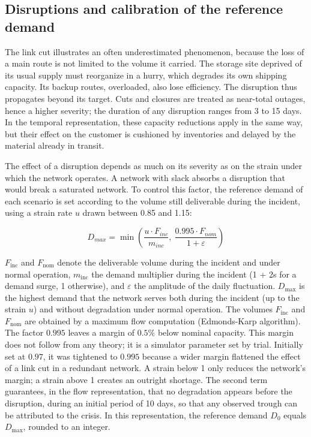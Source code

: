 \subsection{Disruptions and calibration of the reference demand}
\label{sec:S3.3}

The link cut illustrates an often underestimated phenomenon, because the loss of a main route is not limited to the volume it carried. The storage site deprived of its usual supply must reorganize in a hurry, which degrades its own shipping capacity. Its backup routes, overloaded, also lose efficiency. The disruption thus propagates beyond its target. Cuts and closures are treated as near-total outages, hence a higher severity; the duration of any disruption ranges from 3 to 15 days. In the temporal representation, these capacity reductions apply in the same way, but their effect on the customer is cushioned by inventories and delayed by the material already in transit.

The effect of a disruption depends as much on its severity as on the strain under which the network operates. A network with slack absorbs a disruption that would break a saturated network. To control this factor, the reference demand of each scenario is set according to the volume still deliverable during the incident, using a strain rate $u$ drawn between 0.85 and 1.15:

\begin{equation}
D_{max} = \min\left(\frac{u \cdot F_{inc}}{m_{inc}},\ \frac{0.995 \cdot F_{nom}}{1 + \varepsilon}\right)
\label{eq:S2}
\end{equation}

$F_{\mathrm{inc}}$ and $F_{\mathrm{nom}}$ denote the deliverable volume during the incident and under normal operation, $m_{\mathrm{inc}}$ the demand multiplier during the incident (1 + 2s for a demand surge, 1 otherwise), and $\varepsilon$ the amplitude of the daily fluctuation. $D_{\max}$ is the highest demand that the network serves both during the incident (up to the strain $u$) and without degradation under normal operation. The volumes $F_{\mathrm{inc}}$ and $F_{\mathrm{nom}}$ are obtained by a maximum flow computation (Edmonds-Karp algorithm). The factor $0.995$ leaves a margin of $0.5\%$ below nominal capacity. This margin does not follow from any theory; it is a simulator parameter set by trial. Initially set at $0.97$, it was tightened to $0.995$ because a wider margin flattened the effect of a link cut in a redundant network. A strain below 1 only reduces the network's margin; a strain above 1 creates an outright shortage. The second term guarantees, in the flow representation, that no degradation appears before the disruption, during an initial period of 10 days, so that any observed trough can be attributed to the crisis. In this representation, the reference demand $D_{0}$ equals $D_{\max}$, rounded to an integer.

